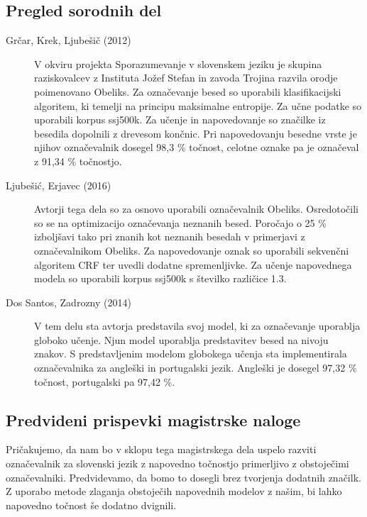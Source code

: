 \documentclass[a4paper, 12pt]{article}
\begin{document}
\subsection{Pregled sorodnih del}

\begin{description}
  \item [Grčar, Krek, Ljubešič (2012) \cite{Grcar2012}] V okviru projekta Sporazumevanje v slovenskem jeziku je skupina raziskovalcev z Instituta Jožef Stefan in zavoda Trojina razvila orodje poimenovano Obeliks. Za označevanje besed so uporabili klasifikacijski algoritem, ki temelji na principu maksimalne entropije. Za učne podatke so uporabili korpus ssj500k. Za učenje in napovedovanje so značilke iz besedila dopolnili z drevesom končnic. Pri napovedovanju besedne vrste je njihov označevalnik dosegel 98,3 \% točnost, celotne oznake pa je označeval z 91,34 \% točnostjo.
  \item [Ljubešić, Erjavec (2016) \cite{Ljubesic2016}] Avtorji tega dela so za osnovo uporabili označevalnik Obeliks. Osredotočili so se na optimizacijo označevanja neznanih besed. Poročajo o 25 \% izboljšavi tako pri znanih kot neznanih besedah v primerjavi z označevalnikom Obeliks. Za napovedovanje oznak so uporabili sekvenčni algoritem CRF ter uvedli dodatne spremenljivke. Za učenje napovednega modela so uporabili korpus ssj500k s številko različice 1.3.
  \item [Dos Santos, Zadrozny (2014) \cite{Santos2014}] V tem delu sta avtorja predstavila svoj model, ki za označevanje uporablja globoko učenje. Njun model uporablja predstavitev besed na nivoju znakov. S predstavljenim modelom globokega učenja sta implementirala označevalnika za angleški in portugalski jezik. Angleški je dosegel 97,32 \% točnost, portugalski pa 97,42 \%.

\end{description}

\subsection{Predvideni prispevki magistrske naloge}

Pričakujemo, da nam bo v sklopu tega magistrskega dela uspelo razviti označevalnik za slovenski jezik z napovedno točnostjo primerljivo z obstoječimi označevalniki. Predvidevamo, da bomo to dosegli brez tvorjenja dodatnih značilk.\\
Z  uporabo metode zlaganja obstoječih napovednih modelov z našim, bi lahko napovedno točnost še dodatno dvignili.
\end{document}
